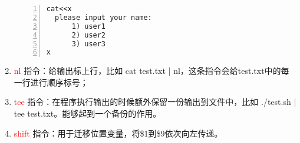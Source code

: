 \begin{enumerate}
    \begin{lstlisting}[language = shell, numbers=left, 
         numberstyle=\tiny,keywordstyle=\color{blue!70},
         commentstyle=\color{red!50!green!50!blue!50},frame=shadowbox,
         rulesepcolor=\color{red!20!green!20!blue!20},basicstyle=\ttfamily]
cat<<x
  please input your name:
      1) user1
      2) user2
      3) user3
x
    \end{lstlisting}
  \item \textcolor{red}{nl} 指令：给输出标上行，比如 cat test.txt | nl，这条指令会给test.txt中的每一行进行顺序标号；
  \item \textcolor{red}{tee} 指令：在程序执行输出的时候额外保留一份输出到文件中，比如 ./test.sh | tee test.txt。能够起到一个备份的作用。
  \item \textcolor{red}{shift} 指令：用于迁移位置变量，将\$1到\$9依次向左传递。
\end{enumerate}


